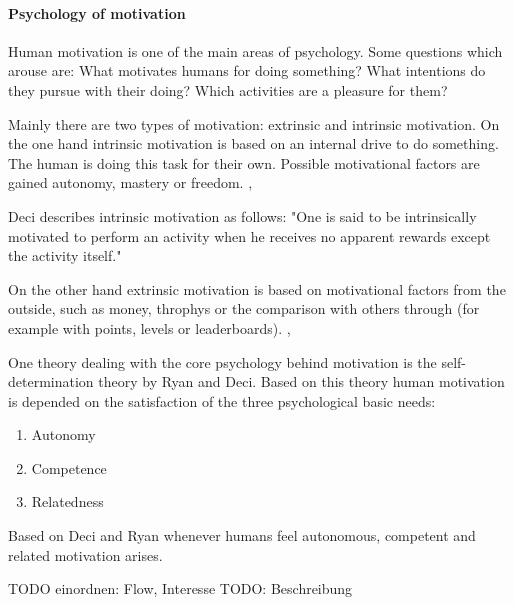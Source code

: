 \paragraph*{Psychology of motivation}
Human motivation is one of the main areas of psychology. Some questions which arouse are: What motivates humans for doing something? What intentions do they pursue with their doing? Which activities are a pleasure for them? \cite[p. 1]{bierhoffeditorEnzyklopaediePsychologieSoziale2016}

Mainly there are two types of motivation: extrinsic and intrinsic motivation. 
On the one hand intrinsic motivation is based on an internal drive to do something. The human is doing this task for their own. Possible motivational factors are gained autonomy, mastery or freedom. \cite[p. 2, 3, 4]{bierhoffeditorEnzyklopaediePsychologieSoziale2016}, \cite[p. 60, 61]{inproceedings}

Deci describes intrinsic motivation as follows: "One is said to be intrinsically motivated to perform an activity when he receives no apparent rewards except the activity itself." \cite[p. 105]{deciEffectsExternallyMediated1971}

On the other hand extrinsic motivation is based on motivational factors from the outside, such as money, throphys or the comparison with others through (for example with points, levels or leaderboards). \cite[p. 2, 3, 4]{bierhoffeditorEnzyklopaediePsychologieSoziale2016}, \cite[p. 60, 61]{inproceedings}

\label{selfDeterminationTheory}
One theory dealing with the core psychology behind motivation is the self-determination theory by Ryan and Deci. Based on this theory human motivation is depended on the satisfaction of the three psychological basic needs: 
\begin{enumerate}
	\item Autonomy
	\item Competence
	\item Relatedness
\end{enumerate} 
Based on Deci and Ryan whenever humans feel autonomous, competent and related motivation arises. \cite[p. 416-432]{deciTheoriesSocialPsychology2019}

TODO einordnen: Flow, Interesse \newline
TODO: Beschreibung \cite[p. 19, 20, 21]{bierhoffeditorEnzyklopaediePsychologieSoziale2016}


